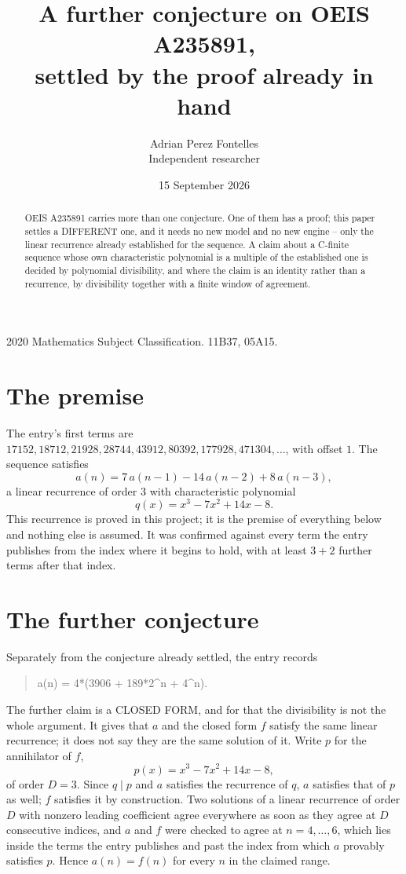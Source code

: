\documentclass[11pt,a4paper]{article}
\title{A further conjecture on OEIS A235891,\\ \large settled by the proof already in hand}
\author{Adrian Perez Fontelles\\ \small Independent researcher}
\date{15 September 2026}
\theoremstyle{plain}
\theoremstyle{definition}
\begin{document}
\maketitle

\begin{abstract}
OEIS A235891 carries more than one conjecture. One of them has a proof; this paper settles a
DIFFERENT one, and it needs no new model and no new engine -- only the linear recurrence already
established for the sequence. A claim about a C-finite sequence whose own characteristic
polynomial is a multiple of the established one is decided by polynomial divisibility, and where
the claim is an identity rather than a recurrence, by divisibility together with a finite window
of agreement.
\end{abstract}

\noindent\small 2020 Mathematics Subject Classification. 11B37, 05A15.\normalsize

\section{The premise}

The entry's first terms are $17152, 18712, 21928, 28744, 43912, 80392, 177928, 471304,\dots$, with offset $1$. The sequence satisfies
\[
  a(n)=7\,a(n-1) - 14\,a(n-2) + 8\,a(n-3) ,
\]
a linear recurrence of order $3$ with characteristic polynomial
\[
  q(x)=x^{3} - 7 x^{2} + 14 x - 8 .
\]
This recurrence is proved in this project; it is the premise of everything below and nothing else is assumed.
It was confirmed against every term the entry publishes from the index where it begins to hold,
with at least $3+2$ further terms after that index.

\section{The further conjecture}

Separately from the conjecture already settled, the entry records

\begin{quote}\raggedright a(n) = 4*(3906 + 189*2\^{}n + 4\^{}n).\end{quote}

The further claim is a CLOSED FORM, and for that the divisibility is not the whole argument. It
gives that $a$ and the closed form $f$ satisfy the same linear recurrence; it does not say they
are the same solution of it. Write $p$ for the annihilator of $f$,
\[
  p(x)=x^{3} - 7 x^{2} + 14 x - 8 ,
\]
of order $D=3$. Since $q\mid p$ and $a$ satisfies the recurrence of $q$, $a$ satisfies that of
$p$ as well; $f$ satisfies it by construction. Two solutions of a linear recurrence of order $D$
with nonzero leading coefficient agree everywhere as soon as they agree at $D$ consecutive
indices, and $a$ and $f$ were checked to agree at $n=4,\dots,6$,
which lies inside the terms the entry publishes and past the index from which $a$ provably
satisfies $p$. Hence $a(n)=f(n)$ for every $n$ in the claimed range.
\end{document}
